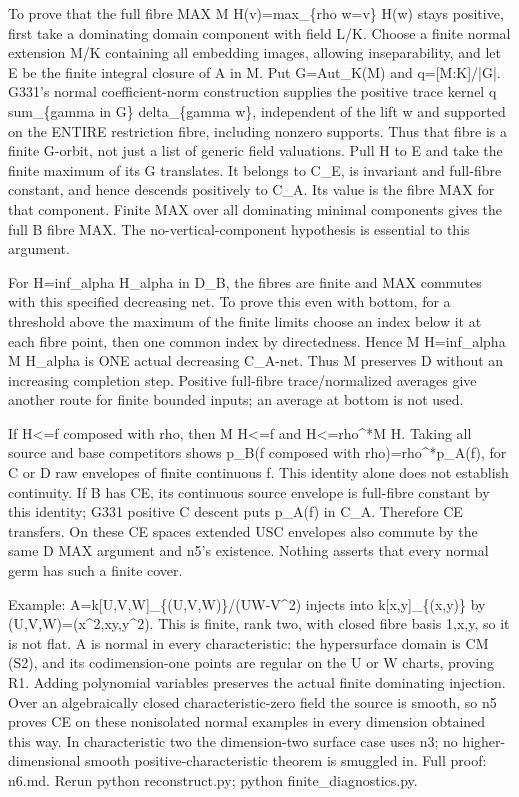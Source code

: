 \documentclass[11pt]{article}
\begin{document}
To prove that the full fibre MAX M H(v)=max\_\{rho w=v\} H(w) stays positive, first take a dominating domain component with field L/K. Choose a finite normal extension M/K containing all embedding images, allowing inseparability, and let E be the finite integral closure of A in M. Put G=Aut\_K(M) and q=[M:K]/|G|. G331's normal coefficient-norm construction supplies the positive trace kernel q sum\_\{gamma in G\} delta\_\{gamma w\}, independent of the lift w and supported on the ENTIRE restriction fibre, including nonzero supports. Thus that fibre is a finite G-orbit, not just a list of generic field valuations. Pull H to E and take the finite maximum of its G translates. It belongs to C\_E, is invariant and full-fibre constant, and hence descends positively to C\_A. Its value is the fibre MAX for that component. Finite MAX over all dominating minimal components gives the full B fibre MAX. The no-vertical-component hypothesis is essential to this argument.

For H=inf\_alpha H\_alpha in D\_B, the fibres are finite and MAX commutes with this specified decreasing net. To prove this even with bottom, for a threshold above the maximum of the finite limits choose an index below it at each fibre point, then one common index by directedness. Hence M H=inf\_alpha M H\_alpha is ONE actual decreasing C\_A-net. Thus M preserves D without an increasing completion step. Positive full-fibre trace/normalized averages give another route for finite bounded inputs; an average at bottom is not used.

If H<=f composed with rho, then M H<=f and H<=rho\textasciicircum{}*M H. Taking all source and base competitors shows p\_B(f composed with rho)=rho\textasciicircum{}*p\_A(f), for C or D raw envelopes of finite continuous f. This identity alone does not establish continuity. If B has CE, its continuous source envelope is full-fibre constant by this identity; G331 positive C descent puts p\_A(f) in C\_A. Therefore CE transfers. On these CE spaces extended USC envelopes also commute by the same D MAX argument and n5's existence. Nothing asserts that every normal germ has such a finite cover.

Example: A=k[U,V,W]\_\{(U,V,W)\}/(UW-V\textasciicircum{}2) injects into k[x,y]\_\{(x,y)\} by (U,V,W)=(x\textasciicircum{}2,xy,y\textasciicircum{}2). This is finite, rank two, with closed fibre basis 1,x,y, so it is not flat. A is normal in every characteristic: the hypersurface domain is CM (S2), and its codimension-one points are regular on the U or W charts, proving R1. Adding polynomial variables preserves the actual finite dominating injection. Over an algebraically closed characteristic-zero field the source is smooth, so n5 proves CE on these nonisolated normal examples in every dimension obtained this way. In characteristic two the dimension-two surface case uses n3; no higher-dimensional smooth positive-characteristic theorem is smuggled in. Full proof: n6.md. Rerun python reconstruct.py; python finite\_diagnostics.py.
\end{document}
